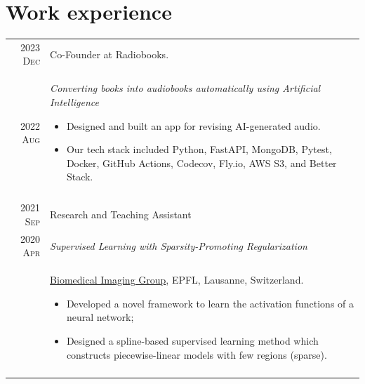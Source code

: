 \documentclass[a4paper,11pt]{article}
\begin{document}

  \newpage

  \section{Work experience}

    \begin{tabular}{r|p{13cm}}

      \textsc{2023 Dec} 	& Co-Founder at Radiobooks. \\
      \textsc{2022 Aug} 	& \emph{Converting books into audiobooks automatically using Artificial Intelligence}
      \begin{itemize}[leftmargin=*,noitemsep]
          \item \footnotesize{Designed and built an app for revising AI-generated audio.}
          \item \footnotesize{Our tech stack included Python, FastAPI, MongoDB, Pytest, Docker, GitHub Actions, Codecov, Fly.io, AWS S3, and Better Stack.}
      \end{itemize} \vspace*{-\baselineskip}\\
      \multicolumn{2}{c}{} \\


      \textsc{2021 Sep} 	& Research and Teaching Assistant \\
      \textsc{2020 Apr} 	& \emph{Supervised Learning with Sparsity-Promoting Regularization} \\
				& \footnotesize{\href{https://bigwww.epfl.ch/}{Biomedical Imaging Group}, EPFL, Lausanne, Switzerland.
				  }
        \begin{itemize}[leftmargin=*,noitemsep]
          \item \footnotesize{Developed a novel framework to learn the activation functions of a neural network;}
          \item \footnotesize{Designed a spline-based supervised learning method which constructs piecewise-linear models with few regions (sparse).}
        \end{itemize} \vspace*{-\baselineskip}\\
      \multicolumn{2}{c}{} \\


\end{tabular}
\end{document}
